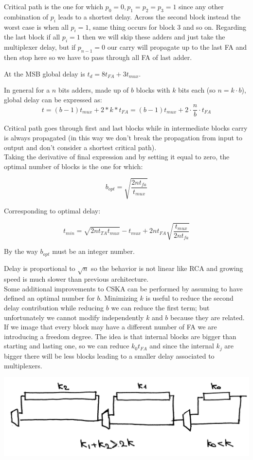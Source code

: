 Critical path is the one for which $p_0=0, p_1=p_2=p_3=1$ since any other
combination of $p_i$ leads to a shortest delay. Across the second block instead
the worst case is when all $p_i =1$, same thing occurs for block 3 and so on.
Regarding the last block if all $p_i=1$ then we will skip these adders and just
take the multiplexer delay, but if $p_{n-1}=0$ our carry will propagate up to
the last FA and then stop here so we have to pass through all FA of last adder.

At the MSB global delay is $t_d=8t_{FA}+3t_{mux}$.

In general for a $n$ bits adders, made up of $b$ blocks with $k$ bits each
(so $n=k \cdot b$), global delay can be expressed as:
$$t= (b-1)t_{mux} + 2 *k* t_{FA}= (b-1)t_{mux} + 2 \cdot \frac{n}{b} \cdot t_{FA}$$

Critical path goes through first and last blocks while in intermediate blocks
carry is always propagated (in this way we don't break the propagation from
input to output and don't consider a shortest critical path).\\
Taking the derivative of final expression and by setting it equal to zero,
the optimal number of blocks is the one for which:

$$b_{opt}=\sqrt{\frac{2nt_{fa}}{t_{mux}}}$$

Corresponding to optimal delay:

$$t_{min}=\sqrt{2nt_{TA}t_{mux}}-t_{mux}+2nt_{FA} \sqrt{\frac{t_{mux}}{2nt_{fa}}}$$

By the way $b_{opt}$ must be an integer number.

Delay is proportional to $\sqrt{n}$ so the behavior is not linear like RCA and
growing speed is much slower than previous architecture.\\

Some additional improvements to CSKA can be performed by assuming to have
defined an optimal number for $b$. Minimizing $k$ is useful to reduce the
second delay contribution while reducing $b$ we can reduce the first term;
but unfortunately we cannot modify independently $k$ and $b$ because they are
related. If we image that every block may have a different number of FA we are
introducing a freedom degree. The idea is that internal blocks are bigger than
starting and lasting one, so we can reduce $k_0t_{FA}$ and since the internal
$k_j$ are bigger there will be less blocks leading to a smaller delay
associated to multiplexers.
\begin{center}
  \includegraphics[width=0.7\linewidth]{img/img2/6}
\end{center}


